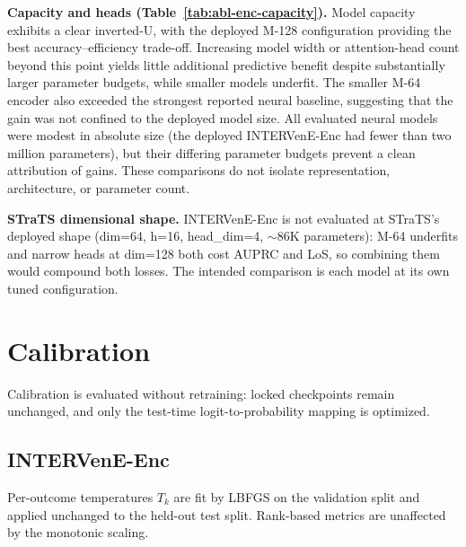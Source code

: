 \textbf{Capacity and heads (Table~\ref{tab:abl-enc-capacity}).} Model capacity exhibits a clear inverted-U, with the deployed M-128 configuration providing the best accuracy--efficiency trade-off. Increasing model width or attention-head count beyond this point yields little additional predictive benefit despite substantially larger parameter budgets, while smaller models underfit. The smaller M-64 encoder also exceeded the strongest reported neural baseline, suggesting that the gain was not confined to the deployed model size. All evaluated neural models were modest in absolute size (the deployed INTERVenE-Enc had fewer than two million parameters), but their differing parameter budgets prevent a clean attribution of gains. These comparisons do not isolate representation, architecture, or parameter count.

\textbf{STraTS dimensional shape.} INTERVenE-Enc is not evaluated at STraTS's deployed shape (dim=64, h=16, head\_dim=4, $\sim$86K parameters): M-64 underfits and narrow heads at dim=128 both cost AUPRC and LoS, so combining them would compound both losses. The intended comparison is each model at its own tuned configuration.

\section{Calibration}
\label{app:calibration}

Calibration is evaluated without retraining: locked checkpoints remain unchanged, and only the test-time logit-to-probability mapping is optimized.

\subsection{INTERVenE-Enc}

Per-outcome temperatures $T_k$ are fit by LBFGS on the validation split and applied unchanged to the held-out test split. Rank-based metrics are unaffected by the monotonic scaling.

